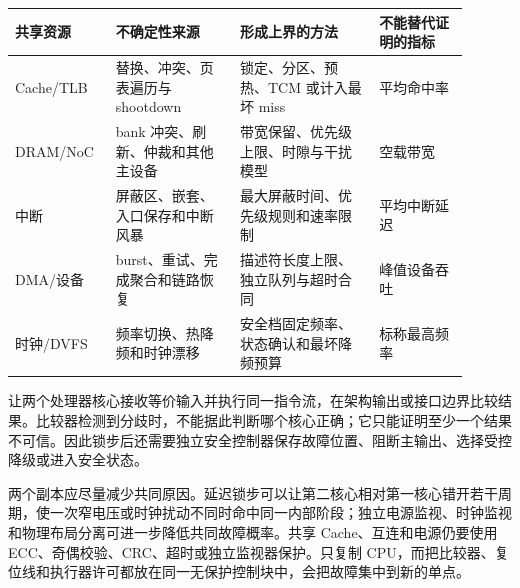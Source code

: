 \begin{longtable}{L{0.18\linewidth}L{0.25\linewidth}L{0.29\linewidth}L{0.18\linewidth}}
\toprule
共享资源 & 不确定性来源 & 形成上界的方法 & 不能替代证明的指标 \\
\midrule
Cache/TLB & 替换、冲突、页表遍历与 shootdown & 锁定、分区、预热、TCM 或计入最坏 miss & 平均命中率 \\\tablerowrule
DRAM/NoC & bank 冲突、刷新、仲裁和其他主设备 & 带宽保留、优先级上限、时隙与干扰模型 & 空载带宽 \\\tablerowrule
中断 & 屏蔽区、嵌套、入口保存和中断风暴 & 最大屏蔽时间、优先级规则和速率限制 & 平均中断延迟 \\\tablerowrule
DMA/设备 & burst、重试、完成聚合和链路恢复 & 描述符长度上限、独立队列与超时合同 & 峰值设备吞吐 \\\tablerowrule
时钟/DVFS & 频率切换、热降频和时钟漂移 & 安全档固定频率、状态确认和最坏降频预算 & 标称最高频率 \\
\bottomrule
\end{longtable}


让两个处理器核心接收等价输入并执行同一指令流，在架构输出或接口边界比较结果。比较器检测到分歧时，不能据此判断哪个核心正确；它只能证明至少一个结果不可信。因此锁步后还需要独立安全控制器保存故障位置、阻断主输出、选择受控降级或进入安全状态。

两个副本应尽量减少共同原因。延迟锁步可以让第二核心相对第一核心错开若干周期，使一次窄电压或时钟扰动不同时命中同一内部阶段；独立电源监视、时钟监视和物理布局分离可进一步降低共同故障概率。共享 Cache、互连和电源仍要使用 ECC、奇偶校验、CRC、超时或独立监视器保护。只复制 CPU，而把比较器、复位线和执行器许可都放在同一无保护控制块中，会把故障集中到新的单点。

